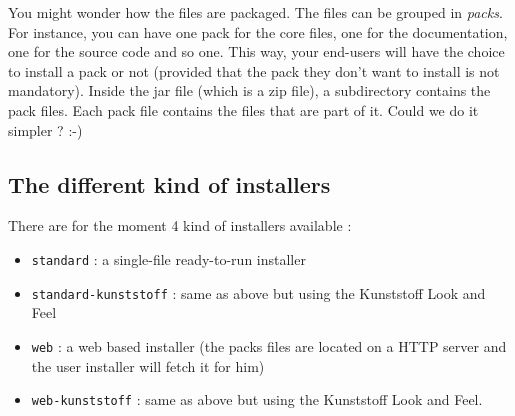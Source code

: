 You might wonder how the files are packaged. The files can be grouped in
\textit{packs}. For instance, you can have one pack for the core files, one for
the documentation, one for the source code and so one. This way, your end-users
will have the choice to install a pack or not (provided that the pack they don't
want to install is not mandatory). Inside the jar file (which is a zip file), a
subdirectory contains the pack files. Each pack file contains the files that are
part of it. Could we do it simpler ? :-)\\

\subsection{The different kind of installers}

There are for the moment 4 kind of installers available :
\begin{itemize}

  \item \texttt{standard} : a single-file ready-to-run installer
  \item \texttt{standard-kunststoff} : same as above but using the Kunststoff
  Look and Feel
  \item \texttt{web} : a web based installer (the packs files are located on a
  HTTP server and the user installer will fetch it for him)
  \item \texttt{web-kunststoff} : same as above but using the Kunststoff
  Look and Feel.

\end{itemize}\
